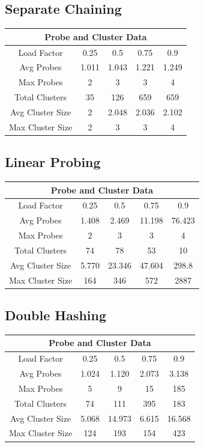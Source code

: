 \documentclass[titlepage]{article}
\begin{document}
\subsection{Separate Chaining}
\begin{tabular}{ |c|c|c|c|c| } 
\hline
\multicolumn{5}{|c|}{Probe and Cluster Data}\\
\hline
Load Factor & 0.25 & 0.5 & 0.75 & 0.9 \\
\hline
Avg Probes & 1.011 & 1.043 & 1.221 & 1.249\\
\hline
Max Probes & 2 & 3 & 3 & 4 \\
\hline
Total Clusters & 35 & 126 & 659 & 659\\
\hline
Avg Cluster Size & 2 & 2.048 & 2.036 & 2.102\\
\hline
Max Cluster Size & 2 & 3 & 3 & 4 \\
\hline
\end{tabular}

\subsection{Linear Probing}
\begin{tabular}{ |c|c|c|c|c| } 
\hline
\multicolumn{5}{|c|}{Probe and Cluster Data}\\
\hline
Load Factor & 0.25 & 0.5 & 0.75 & 0.9 \\
\hline
Avg Probes & 1.408 & 2.469 & 11.198 & 76.423\\
\hline
Max Probes & 2 & 3 & 3 & 4 \\
\hline
Total Clusters & 74 & 78 & 53 & 10\\
\hline
Avg Cluster Size & 5.770 & 23.346 & 47.604 & 298.8\\
\hline
Max Cluster Size & 164 & 346 & 572 & 2887 \\
\hline
\end{tabular}

\subsection{Double Hashing}
\begin{tabular}{ |c|c|c|c|c| } 
\hline
\multicolumn{5}{|c|}{Probe and Cluster Data}\\
\hline
Load Factor & 0.25 & 0.5 & 0.75 & 0.9 \\
\hline
Avg Probes & 1.024 & 1.120 & 2.073 & 3.138\\
\hline
Max Probes & 5 & 9 & 15 & 185 \\
\hline
Total Clusters & 74 & 111 & 395 & 183\\
\hline
Avg Cluster Size & 5.068 & 14.973 & 6.615 & 16.568\\
\hline
Max Cluster Size & 124 & 193 & 154 & 423 \\
\hline
\end{tabular}
\end{document}
